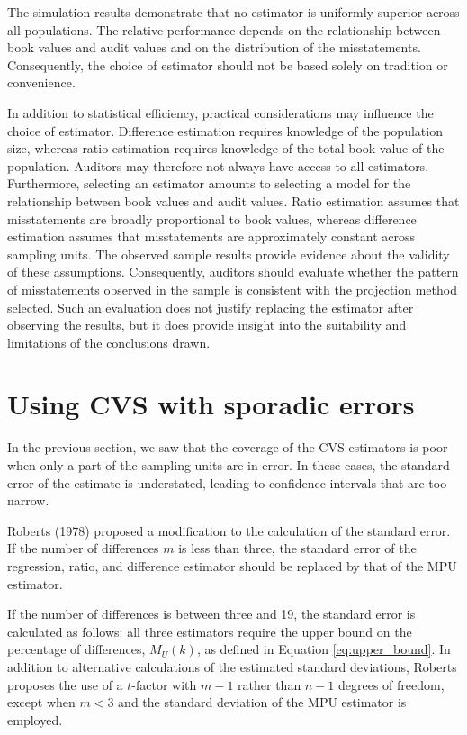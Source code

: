 \bigskip
The simulation results demonstrate that no estimator is uniformly superior across all populations. The relative performance depends on the relationship between book values and audit values and on the distribution of the misstatements. Consequently, the choice of estimator should not be based solely on tradition or convenience.

In addition to statistical efficiency, practical considerations may influence the choice of estimator. 
Difference estimation requires knowledge of the population size, whereas ratio estimation requires knowledge of the total book value of the population. 
Auditors may therefore not always have access to all estimators. Furthermore, selecting an estimator amounts to selecting a model for the relationship between book values and audit values. 
Ratio estimation assumes that misstatements are broadly proportional to book values, whereas difference estimation assumes that misstatements are approximately constant across sampling units. 
The observed sample results provide evidence about the validity of these assumptions. 
Consequently, auditors should evaluate whether the pattern of misstatements observed in the sample is consistent with the projection method selected. 
Such an evaluation does not justify replacing the estimator after observing the results, but it does provide insight into the suitability and limitations of the conclusions drawn.


\section{Using CVS with sporadic errors} %
\label{sec:using_cvs_with_sporadic_errors}


In the previous section, we saw that the coverage of the CVS estimators is poor when only a part of the sampling units are in error. In these cases, the standard error of the estimate is understated, leading to confidence intervals that are too narrow.

Roberts (1978) proposed a modification to the calculation of the standard error. If the number of differences $m$ is less than three, the standard error of the regression, ratio, and difference estimator should be replaced by that of the MPU estimator.

If the number of differences is between three and 19, the standard error is calculated as follows: all three estimators require the upper bound on the percentage of differences, $M_U(k)$, as defined in Equation \ref{eq:upper_bound}. In addition to alternative calculations of the estimated standard deviations, Roberts proposes the use of a $t$-factor with $m -1$ rather than $n - 1$ degrees of freedom, except when $m < 3$ and the standard deviation of the MPU estimator is employed.

